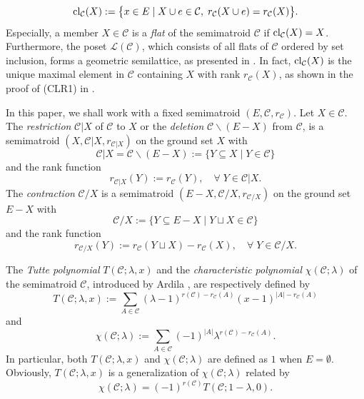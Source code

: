 \documentclass[12pt]{article}%
\numberwithin{equation}{section}
\begin{document}
\[
{\rm cl}_{\mathcal{C}}(X):=\big\{x\in E\mid X\cup e\in\mathcal{C},\;r_{\mathcal{C}}(X\cup e)=r_{\mathcal{C}}(X)\big\}.
\]
Especially, a member $X\in\mathcal{C}$ is a {\em flat} of  the semimatroid $\mathcal{C}$ if ${\rm cl}_{\mathcal{C}}(X)=X$. Furthermore, the poset $\mathscr{L}(\mathcal{C})$, which consists of all flats of $\mathcal{C}$ ordered by set inclusion, forms a geometric semilattice, as presented in \cite[Theorem 6.4]{Ardila2007}. In fact, ${\rm cl}_{\mathcal{C}}(X)$ is the unique maximal element in $\mathcal{C}$ containing $X$ with rank $r_{\mathcal{C}}(X)$, as shown in the proof of {\rm (CLR1)} in \cite[Proposition 2.4]{Ardila2007}.

In this paper, we shall work with a fixed semimatroid $(E,\mathcal{C},r_{\mathcal{C}})$. Let $X\in\mathcal{C}$. The {\em restriction} $\mathcal{C}|X$ of $\mathcal{C}$ to $X$ or the {\em deletion} $\mathcal{C}\backslash (E-X)$ from $\mathcal{C}$, is a semimatroid $(X,\mathcal{C}|X,r_{\mathcal{C}|X})$ on the ground set $X$ with 
\begin{equation}\label{Deletion1}
\mathcal{C}|X=\mathcal{C}\backslash (E-X):=\{Y\subseteq X\mid Y\in\mathcal{C}\}
\end{equation}
and the rank function
\begin{equation}\label{Deletion-Rank-Semi}
r_{\mathcal{C}|X}(Y):=r_{\mathcal{C}}(Y),\quad\forall \;Y\in\mathcal{C}|X.
\end{equation}
The {\em contraction} $\mathcal{C}/X$ is a semimatroid $(E-X,\mathcal{C}/X,r_{\mathcal{C}/X})$ on the ground set $E-X$ with
\begin{equation}\label{Contraction1}
\mathcal{C}/X:=\{Y\subseteq E-X\mid Y\sqcup X\in\mathcal{C}\}
\end{equation}
and the rank function
\begin{equation}\label{Contraction-Rank-Semi}
r_{\mathcal{C}/X}(Y):=r_{\mathcal{C}}(Y\sqcup X)-r_{\mathcal{C}}(X),\quad\forall \;Y\in\mathcal{C}/X.
\end{equation}

The {\em Tutte polynomial} $T(\mathcal{C};\lambda,x)$  and  the {\em characteristic polynomial} $\chi(\mathcal{C};\lambda)$ of the semimatroid $\mathcal{C}$, introduced by Ardila \cite{Ardila2007}, are respectively defined by
\[
T(\mathcal{C};\lambda,x):=\sum_{A\in\mathcal{C}}(\lambda-1)^{r(\mathcal{C})-r_{\mathcal{C}}(A)}(x-1)^{|A|-r_{\mathcal{C}}(A)}
\]
and
\[
\chi(\mathcal{C};\lambda):=\sum_{A\in\mathcal{C}}(-1)^{|A|}\lambda^{r(\mathcal{C})-r_{\mathcal{C}}(A)}.
\]
In particular, both $T(\mathcal{C};\lambda,x)$ and $\chi(\mathcal{C};\lambda)$ are defined as $1$ when $E=\emptyset$. Obviously, $T(\mathcal{C};\lambda,x)$ is a generalization of  $\chi(\mathcal{C};\lambda)$ related by 
\[
\chi(\mathcal{C};\lambda)=(-1)^{r(\mathcal{C})}T(\mathcal{C};1-\lambda,0).
\]
\end{document}
